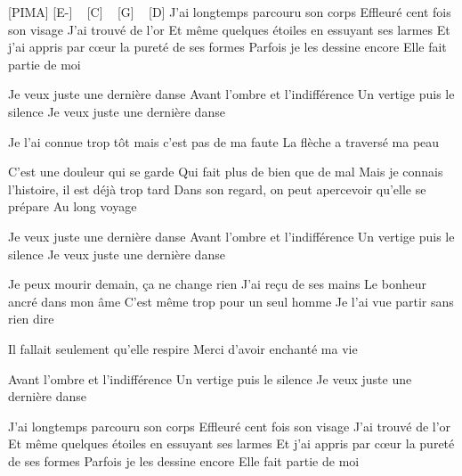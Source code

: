 [PIMA]
[E-] ~ [C] ~ [G] ~ [D]
J'ai longtemps parcouru son corps
Effleuré cent fois son visage
J'ai trouvé de l'or
Et même quelques étoiles en essuyant ses larmes
Et j'ai appris par cœur la pureté de ses formes
Parfois je les dessine encore
Elle fait partie de moi

Je veux juste une dernière danse
Avant l'ombre et l'indifférence
Un vertige puis le silence
Je veux juste une dernière danse

Je l'ai connue trop tôt mais c'est pas de ma faute
La flèche a traversé ma peau

C'est une douleur qui se garde
Qui fait plus de bien que de mal
Mais je connais l'histoire, il est déjà trop tard
Dans son regard, on peut apercevoir qu'elle se prépare
Au long voyage

Je veux juste une dernière danse
Avant l'ombre et l'indifférence
Un vertige puis le silence
Je veux juste une dernière danse

Je peux mourir demain, ça ne change rien
J'ai reçu de ses mains
Le bonheur ancré dans mon âme
C'est même trop pour un seul homme
Je l'ai vue partir sans rien dire

Il fallait seulement qu'elle respire
Merci d'avoir enchanté ma vie

Avant l'ombre et l'indifférence
Un vertige puis le silence
Je veux juste une dernière danse

J'ai longtemps parcouru son corps
Effleuré cent fois son visage
J'ai trouvé de l'or
Et même quelques étoiles en essuyant ses larmes
Et j'ai appris par cœur la pureté de ses formes
Parfois je les dessine encore
Elle fait partie de moi

